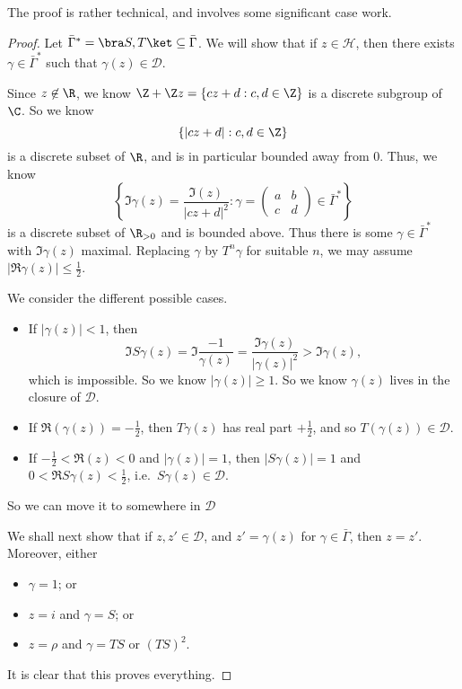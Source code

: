 \documentclass[a4paper]{article}
\renewcommand{\H}{\mathcal{H}}
\begin{document}
The proof is rather technical, and involves some significant case work.
\begin{proof}
  Let $\bar{\Gamma}^* = \bra S, T\ket \subseteq \bar{\Gamma}$. We will show that if $z \in \H$, then there exists $\gamma \in \bar\Gamma^*$ such that $\gamma(z) \in \mathcal{D}$.

  Since $z \not \in \R$, we know $\Z + \Z z = \{cz + d: c, d \in \Z\}$ is a discrete subgroup of $\C$. So we know
  \[
    \{|cz + d|: c, d \in \Z\}
  \]
  is a discrete subset of $\R$, and is in particular bounded away from $0$. Thus, we know
  \[
    \left\{\Im \gamma(z) = \frac{\Im (z)}{|cz + d|^2}: \gamma =
    \begin{pmatrix}
      a & b\\
      c & d
    \end{pmatrix} \in \bar\Gamma^*\right\}
  \]
  is a discrete subset of $\R_{>0}$ and is bounded above. Thus there is some $\gamma \in \bar{\Gamma}^*$ with $\Im \gamma(z)$ maximal. Replacing $\gamma$ by $T^n \gamma$ for suitable $n$, we may assume $|\Re \gamma(z)| \leq \frac{1}{2}$.

  We consider the different possible cases.
  \begin{itemize}
    \item If $|\gamma(z)| < 1$, then
      \[
        \Im S \gamma(z) = \Im \frac{-1}{\gamma(z)} = \frac{\Im \gamma(z)}{|\gamma(z)|^2} > \Im \gamma(z),
      \]
      which is impossible. So we know $|\gamma(z)| \geq 1$. So we know $\gamma(z)$ lives in the closure of $\mathcal{D}$.

    \item If $\Re(\gamma(z)) = -\frac{1}{2}$, then $T \gamma(z)$ has real part $+\frac{1}{2}$, and so $T(\gamma(z)) \in \mathcal{D}$.

    \item If $-\frac{1}{2} < \Re(z) < 0$ and $|\gamma(z)| = 1$, then $|S\gamma(z)| = 1$ and $0 < \Re S\gamma(z) < \frac{1}{2}$, i.e.\ $S \gamma(z) \in \mathcal{D}$.
  \end{itemize}
  So we can move it to somewhere in $\mathcal{D}$

  \separator

  We shall next show that if $z, z' \in \mathcal{D}$, and $z' = \gamma(z)$ for $\gamma \in \bar{\Gamma}$, then $z = z'$. Moreover, either
  \begin{itemize}
    \item $\gamma = 1$; or
    \item $z = i$ and $\gamma = S$; or
    \item $z = \rho$ and $\gamma = TS$ or $(TS)^2$.
  \end{itemize}
  It is clear that this proves everything.


\end{proof}
\end{document}
